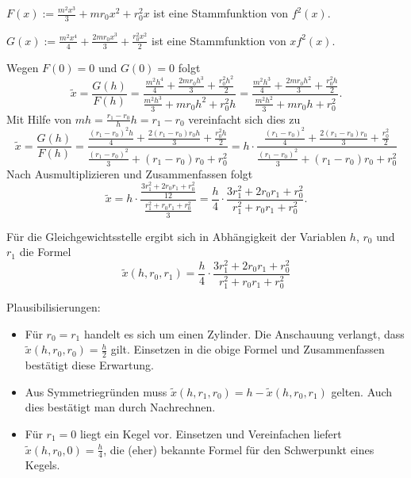 \documentclass{article}
\begin{document}
$F(x) := \frac{m^2x^3}{3}+mr_0x^2+r_0^2x$ ist eine Stammfunktion von $f^2(x)$.

$G(x) := \frac{m^2x^4}{4}+\frac{2mr_0x^3}{3}+\frac{r_0^2x^2}{2}$ ist eine Stammfunktion von $xf^2(x)$.

Wegen $F(0) = 0$ und $G(0) = 0$ folgt 
$$\tilde{x} = \frac{G(h)}{F(h)} = \frac{\frac{m^2h^4}{4}+\frac{2mr_0h^3}{3}+\frac{r_0^2h^2}{2}}{\frac{m^2h^3}{3}+mr_0h^2+r_0^2h}=\frac{\frac{m^2h^3}{4}+\frac{2mr_0h^2}{3}+\frac{r_0^2h}{2}}{\frac{m^2h^2}{3}+mr_0h+r_0^2}.$$
Mit Hilfe von $mh=\frac{r_1-r_0}{h}h = r_1-r_0$ vereinfacht sich dies zu 
$$\tilde{x} = \frac{G(h)}{F(h)} = \frac{\frac{(r_1-r_0)^2h}{4}+\frac{2(r_1-r_0)r_0h}{3}+\frac{r_0^2h}{2}}{\frac{(r_1-r_0)^2}{3}+(r_1-r_0)r_0+r_0^2} = h\cdot\frac{\frac{(r_1-r_0)^2}{4}+\frac{2(r_1-r_0)r_0}{3}+\frac{r_0^2}{2}}{\frac{(r_1-r_0)^2}{3}+(r_1-r_0)r_0+r_0^2}$$
Nach Ausmultiplizieren und Zusammenfassen folgt
$$\tilde{x} = h\cdot \frac{\frac{3r_1^2+2r_0r_1+r_0^2}{12}}{\frac{r_1^2 + r_0r_1+r_0^2}{3}} = \frac{h}{4}\cdot \frac{3r_1^2+2r_0r_1+r_0^2}{r_1^2 + r_0r_1+r_0^2}.$$
\begin{mdframed}[style=resultdefault]
	Für die Gleichgewichtsstelle ergibt sich in Abhängigkeit der Variablen $h$, $r_0$ und $r_1$ die Formel\\
	$$\tilde{x}(h, r_0, r_1) = \frac{h}{4}\cdot \frac{3r_1^2+2r_0r_1+r_0^2}{r_1^2 + r_0r_1+r_0^2}$$
\end{mdframed}


Plausibilisierungen:
\begin{itemize}
	\item Für $r_0 = r_1$ handelt es sich um einen Zylinder. Die Anschauung verlangt, dass $\tilde{x}(h, r_0, r_0) = \frac{h}{2}$ gilt. Einsetzen in die obige Formel und Zusammenfassen bestätigt diese Erwartung.
	\item Aus Symmetriegründen muss $\tilde{x}(h, r_1, r_0) = h - \tilde{x}(h, r_0, r_1)$ gelten. Auch dies bestätigt man durch  Nachrechnen.
	\item Für $r_1=0$ liegt ein Kegel vor. Einsetzen und Vereinfachen liefert $\tilde{x}(h, r_0, 0) = \frac{h}{4}$, die (eher) bekannte Formel für den Schwerpunkt eines Kegels.
\end{itemize}
\end{document}
